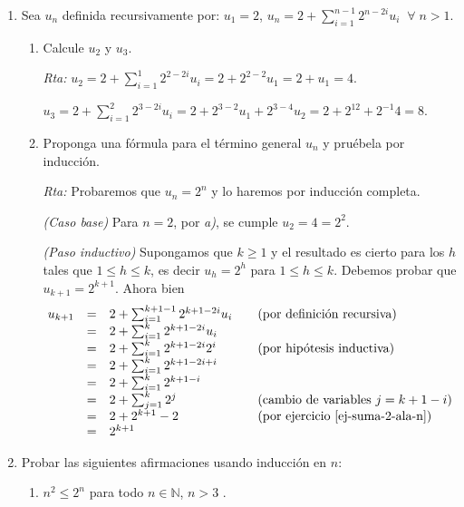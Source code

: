 \documentclass[12pt,spanish,makeidx]{amsbook}
\newcommand{\rta}{\noindent\textit{Rta: }}
\begin{document}
\begin{enumerate}
		\item Sea $u_n$ definida recursivamente por: $u_1=2$, $u_n=2+\sum_{i=1}^{n-1}2^{n-2i}u_i \;\;\forall\; n >1$.
		\begin{enumerate}
			\item Calcule $u_2$ y $u_3$.
			
			\rta $u_2 = 2+\sum_{i=1}^{1}2^{2-2i}u_i = 2+2^{2-2}u_1 = 2 + u_1 = 4$.
			
			$u_3 = 2+\sum_{i=1}^{2}2^{3-2i}u_i = 2+2^{3-2}u_1 + 2^{3-4}u_2=2+2^12 + 2^{-1}4 = 8$.
			
			\item Proponga una fórmula para el término general $u_n$ y pruébela por inducción.
			
			\rta Probaremos  que $u_n = 2^n$ y lo haremos por inducción completa. 
			
			\textit{(Caso base) } Para $n=2$, por \textit{a)}, se cumple $u_2 = 4 =2^2$. 
			
			\textit{(Paso inductivo) } Supongamos que $k \ge 1$ y el resultado  es cierto para los $h$ tales que  $1 \le h \le k$,  es decir $u_h=2^h$ para $1 \le h \le k$. Debemos probar que $u_{k+1} = 2^{k+1}$. Ahora bien
			\begin{equation*}
			\begin{matrix}
			u_{k+1} &=& 2+\sum_{i=1}^{k+1-1}2^{k+1-2i}u_i \hfill &\quad \text{(por definición recursiva)} \hfill \\
			&=& 2+\sum_{i=1}^{k}2^{k+1-2i}u_i \hfill &\hfill\\
			&=& 2+\sum_{i=1}^{k}2^{k+1-2i}2^i \hfill &\quad \text{(por hipótesis inductiva)}\hfill \\
			&=& 2+\sum_{i=1}^{k}2^{k+1-2i+ i} \hfill  & \hfill\\
			&=& 2+\sum_{i=1}^{k}2^{k+1-i} \hfill  & \hfill\\
			&=& 2+\sum_{j=1}^{k}2^{j} \hfill  &\quad \text{(cambio de variables $j =k +1-i$)}\hfill \\
			&=& 2+2^{k+1} -2 \hfill  &\quad \text{(por ejercicio \ref{ej-suma-2-ala-n})}\hfill \\
				&=& 2^{k+1} \hfill  &\quad \hfill
			\end{matrix}
			\end{equation*} 
		\end{enumerate}
		
		
		\smallskip
		
		\item Probar las siguientes afirmaciones usando inducción en $n$:
		\begin{enumerate}
			\item $n^2\leq 2^n$ para todo $n\in{\mathbb N}$, $n>3$ .
			

\end{enumerate}
\end{enumerate}
\end{document}
